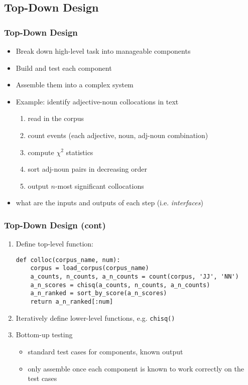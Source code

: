 \documentclass[handout]{beamer}
\begin{document}
\subsection{Top-Down Design}

\begin{frame}
\frametitle{Top-Down Design}
\begin{itemize}
\item Break down high-level task into manageable components
\item Build and test each component
\item Assemble them into a complex system
\item Example: identify adjective-noun collocations in text
  \begin{enumerate}
  \item read in the corpus
  \item count events (each adjective, noun, adj-noun combination)
  \item compute $\chi^2$ statistics
  \item sort adj-noun pairs in decreasing order
  \item output $n$-most significant collocations
  \end{enumerate}
\item what are the inputs and outputs of each step (i.e. \textit{interfaces})
\end{itemize}
\end{frame}

\begin{frame}[fragile]
\frametitle{Top-Down Design (cont)}

\begin{enumerate}
\item Define top-level function:

\begin{verbatim}
def colloc(corpus_name, num):
    corpus = load_corpus(corpus_name)
    a_counts, n_counts, a_n_counts = count(corpus, 'JJ', 'NN')
    a_n_scores = chisq(a_counts, n_counts, a_n_counts)
    a_n_ranked = sort_by_score(a_n_scores)
    return a_n_ranked[:num]
\end{verbatim}

\item Iteratively define lower-level functions, e.g. \texttt{chisq()}

\item Bottom-up testing
\begin{itemize}
\item standard test cases for components, known output
\item only assemble once each component is known to work correctly
  on the test cases
\end{itemize}
\end{enumerate}
\end{frame}
\end{document}
